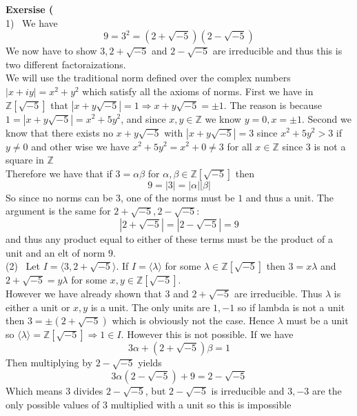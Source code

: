 \documentclass[12pt]{article}
\newenvironment{ques}[1]{\textbf{Exersise #1}\vspace{1 mm}\\ }{\bigskip}
\theoremstyle{definition}
\newcommand{\Z}{\mathbb Z}
\begin{document}
\begin{ques}{5.5}
	(1) \ We have 
	$$9 = 3^2 = (2 + \sqrt{-5})(2 - \sqrt{-5})$$
	We now have to show $3, 2 + \sqrt{-5}$ and $2 - \sqrt{-5}$ are irreducible
	and thus this is two different factoraizations.\\
	We will use the traditional norm defined over the complex numbers $|x + iy|
	= x^2 + y^2$ which satisfy all the axioms of norms. First we have in
	$\Z[\sqrt{-5}]$ that $|x + y\sqrt{-5}| = 1 \Rightarrow x + y\sqrt{-5} = \pm
	1$. The reason is because $1 = |x + y\sqrt{-5}| = x^2 + 5y^2$, and since
	$x, y \in \Z$ we know $y = 0, x = \pm 1$. Second we know that there exists
	no $x + y\sqrt{-5}$ with $|x + y\sqrt{-5}| = 3$ since $x^2 + 5y^2 > 3$ if $y \neq
	0$ and other wise we have $x^2 + 5y^2 = x^2 + 0 \neq 3$ for all $x \in \Z$
	since $3$ is not a square in $\Z$\\
	Therefore we have that if $3 = \alpha \beta$ for $\alpha, \beta \in
	\Z[\sqrt{-5}]$ then 
	$$9 = |3| = |\alpha| |\beta|$$
	So since no norms can be 3, one of the norms must be $1$ and thus a unit.
	The argument is the same for $2 + \sqrt{-5}, 2 - \sqrt{-5}$:
	$$|2 + \sqrt{-5}| = |2 - \sqrt{-5}| = 9$$
	and thus any product equal to either of these terms must be the product of
	a unit and an elt of norm $9$.
	\\
	(2) \ Let $I = \langle 3, 2 + \sqrt{-5} \rangle$. If $I = \langle \lambda
	\rangle$ for some $\lambda \in \Z[\sqrt {-5}]$ then $3 = x\lambda$
	and $2 + \sqrt{-5} = y\lambda$ for some $x,y
	\in \Z[\sqrt{-5}]$.\\
	However we have already shown that $3$ and $2 + \sqrt{-5}$ are irreducible.
	Thus $\lambda$ is either a unit or $x, y$ is a unit. The only units are $1,
	-1$ so if lambda is not a unit then $3= \pm (2 + \sqrt{-5})$ which is
	obviously not the case.
	Hence $\lambda$ must be a unit so $\langle\lambda\rangle = \Z[\sqrt{-5}]
	\Rightarrow 1 \in I$. However this is not possible. If we have
	$$3\alpha + (2 + \sqrt{-5})\beta = 1$$
	Then multiplying by $2 - \sqrt{-5}$ yields
	$$3\alpha(2 - \sqrt{-5}) + 9 = 2 - \sqrt{-5}$$
	Which means $3$ divides $2 - \sqrt{-5}$, but $2 - \sqrt{-5}$ is irreducible
	and $3, -3$ are the only possible values of $3$ multiplied with a unit so
	this is impossible
\end{ques}
\end{document}
